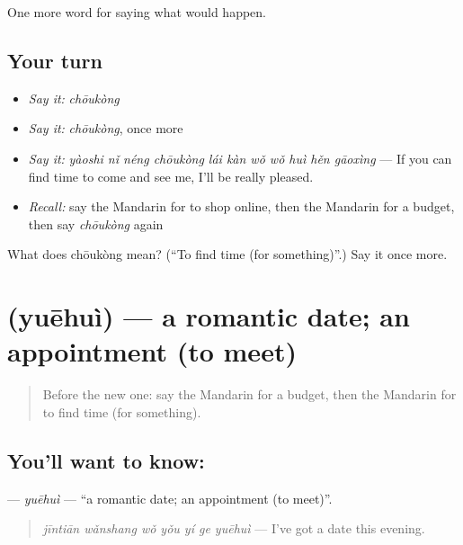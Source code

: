 \begin{grammarlens}[title={What you've built}]
One more word for saying what would happen.
\end{grammarlens}

\subsection*{Your turn}
\begin{itemize}
\raggedright
  \item \emph{Say it:} \emph{chōukòng}
  \item \emph{Say it:} \emph{chōukòng}, once more
  \item \emph{Say it:} \emph{yàoshi nǐ néng chōukòng lái kàn wǒ wǒ huì hěn gāoxìng} — If you can find time to come and see me, I'll be really pleased.
  \item \emph{Recall:} say the Mandarin for to shop online, then the Mandarin for a budget, then say \emph{chōukòng} again
\end{itemize}

\begin{tcolorbox}[breakable,colback=teal!4,colframe=teal!35!black,title={Before you move on}]
What does chōukòng mean? (\textquotedblleft{}To find time (for something)\textquotedblright{}.) Say it once more.
\end{tcolorbox}
\section[\texorpdfstring{\zh{约会} (yuēhuì)}{约会 (yuēhuì)}]{ (yuēhuì) — a romantic date; an appointment (to meet)}

\label{lesson:ZH-C388-yuehui}



\begin{quote}
Before the new one: say the Mandarin for a budget, then the Mandarin for to find time (for something).
\end{quote}

\subsection*{You'll want to know: }
\textbf{} — \emph{yuēhuì} — \textquotedblleft{}a romantic date; an appointment (to meet)\textquotedblright{}.

\begin{quote}
\textbf{} \emph{jīntiān wǎnshang wǒ yǒu yí ge yuēhuì} — I've got a date this evening.
\end{quote}


